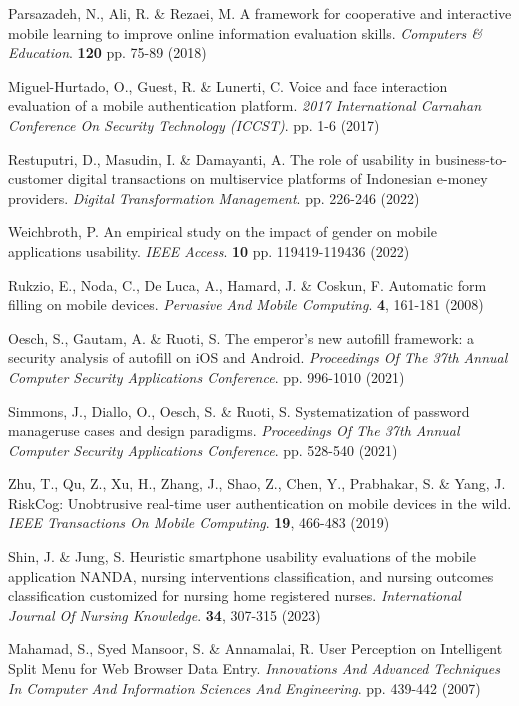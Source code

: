 \documentclass[preprint,12pt]{elsarticle}
\begin{document}
\begin{thebibliography}{99}
Parsazadeh, N., Ali, R. \& Rezaei, M. A framework for cooperative and interactive mobile learning to improve online information evaluation skills. {\em Computers \& Education}. \textbf{120} pp. 75-89 (2018)

Miguel-Hurtado, O., Guest, R. \& Lunerti, C. Voice and face interaction evaluation of a mobile authentication platform. {\em 2017 International Carnahan Conference On Security Technology (ICCST)}. pp. 1-6 (2017)

Restuputri, D., Masudin, I. \& Damayanti, A. The role of usability in business-to-customer digital transactions on multiservice platforms of Indonesian e-money providers. {\em Digital Transformation Management}. pp. 226-246 (2022)

Weichbroth, P. An empirical study on the impact of gender on mobile applications usability. {\em IEEE Access}. \textbf{10} pp. 119419-119436 (2022)

Rukzio, E., Noda, C., De Luca, A., Hamard, J. \& Coskun, F. Automatic form filling on mobile devices. {\em Pervasive And Mobile Computing}. \textbf{4}, 161-181 (2008)

Oesch, S., Gautam, A. \& Ruoti, S. The emperor’s new autofill framework: a security analysis of autofill on iOS and Android. {\em Proceedings Of The 37th Annual Computer Security Applications Conference}. pp. 996-1010 (2021)

Simmons, J., Diallo, O., Oesch, S. \& Ruoti, S. Systematization of password manageruse cases and design paradigms. {\em Proceedings Of The 37th Annual Computer Security Applications Conference}. pp. 528-540 (2021)

Zhu, T., Qu, Z., Xu, H., Zhang, J., Shao, Z., Chen, Y., Prabhakar, S. \& Yang, J. RiskCog: Unobtrusive real-time user authentication on mobile devices in the wild. {\em IEEE Transactions On Mobile Computing}. \textbf{19}, 466-483 (2019)

Shin, J. \& Jung, S. Heuristic smartphone usability evaluations of the mobile application NANDA, nursing interventions classification, and nursing outcomes classification customized for nursing home registered nurses. {\em International Journal Of Nursing Knowledge}. \textbf{34}, 307-315 (2023)

Mahamad, S., Syed Mansoor, S. \& Annamalai, R. User Perception on Intelligent Split Menu for Web Browser Data Entry. {\em Innovations And Advanced Techniques In Computer And Information Sciences And Engineering}. pp. 439-442 (2007)


\end{thebibliography}
\end{document}

